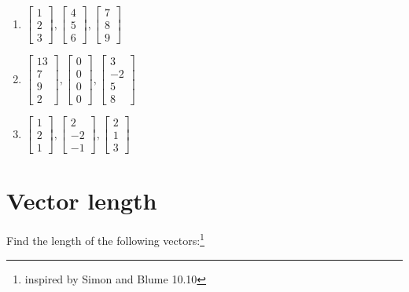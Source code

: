 \documentclass[
]{article}
\begin{document}
\begin{enumerate}
\def\labelenumi{\alph{enumi}.}
\item
  \(\begin{bmatrix} 1 \\ 2 \\ 3 \end{bmatrix}, \begin{bmatrix} 4 \\ 5 \\ 6 \end{bmatrix}, \begin{bmatrix} 7 \\ 8 \\ 9 \end{bmatrix}\)
\item
  \(\begin{bmatrix} 13 \\ 7 \\ 9 \\ 2 \end{bmatrix}, \begin{bmatrix} 0 \\ 0 \\ 0 \\ 0 \end{bmatrix}, \begin{bmatrix} 3 \\ -2 \\ 5 \\ 8 \end{bmatrix}\)
\item
  \(\begin{bmatrix} 1 \\ 2 \\ 1 \end{bmatrix}, \begin{bmatrix} 2 \\ -2 \\ -1 \end{bmatrix}, \begin{bmatrix} 2 \\ 1 \\ 3 \end{bmatrix}\)
\end{enumerate}

\section{Vector length}\label{vector-length}

Find the length of the following vectors:\footnote{inspired by Simon and
  Blume 10.10}
\end{document}

